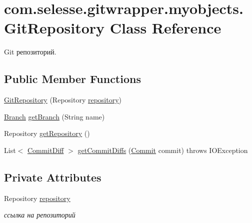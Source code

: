 \hypertarget{classcom_1_1selesse_1_1gitwrapper_1_1myobjects_1_1_git_repository}{}\section{com.\+selesse.\+gitwrapper.\+myobjects.\+Git\+Repository Class Reference}
\label{classcom_1_1selesse_1_1gitwrapper_1_1myobjects_1_1_git_repository}


Git репозиторий.  


\subsection*{Public Member Functions}
\begin{DoxyCompactItemize}
\item 
\hyperlink{classcom_1_1selesse_1_1gitwrapper_1_1myobjects_1_1_git_repository_a29bd6c7c132cae2bbf0325ec1ebb59fd}{Git\+Repository} (Repository \hyperlink{classcom_1_1selesse_1_1gitwrapper_1_1myobjects_1_1_git_repository_aa6470baa26bd93c0c0e538c938ef39c0}{repository})
\item 
\hyperlink{classcom_1_1selesse_1_1gitwrapper_1_1myobjects_1_1_branch}{Branch} \hyperlink{classcom_1_1selesse_1_1gitwrapper_1_1myobjects_1_1_git_repository_a6ce259ea49fb8a1f90ea737e4395e216}{get\+Branch} (String name)
\item 
Repository \hyperlink{classcom_1_1selesse_1_1gitwrapper_1_1myobjects_1_1_git_repository_abe9983bad89ba97034e675390e58a5cd}{get\+Repository} ()
\item 
List$<$ \hyperlink{classcom_1_1selesse_1_1gitwrapper_1_1myobjects_1_1_commit_diff}{Commit\+Diff} $>$ \hyperlink{classcom_1_1selesse_1_1gitwrapper_1_1myobjects_1_1_git_repository_a812212d1f9e588780436955661d926a9}{get\+Commit\+Diffs} (\hyperlink{classcom_1_1selesse_1_1gitwrapper_1_1myobjects_1_1_commit}{Commit} commit)  throws I\+O\+Exception 
\end{DoxyCompactItemize}
\subsection*{Private Attributes}
\begin{DoxyCompactItemize}
\item 
Repository \hyperlink{classcom_1_1selesse_1_1gitwrapper_1_1myobjects_1_1_git_repository_aa6470baa26bd93c0c0e538c938ef39c0}{repository}
\begin{DoxyCompactList}\small\item\em ссылка на репозиторий \end{DoxyCompactList}\end{DoxyCompactItemize}


